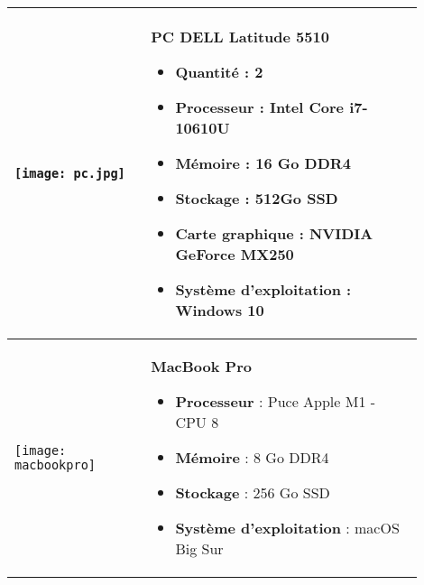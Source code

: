 \begin{longtable}{|p{0.3\linewidth}|p{0.6\linewidth}|}
      \begin{minipage}{\linewidth}
       \texttt{[image: pc.jpg]}
      \end{minipage} &
      \begin{minipage}{\linewidth}
        \vspace{0.2cm}
        \textbf{PC DELL Latitude 5510}
        \begin{itemize}
          \item \textbf{Quantité} : 2
          \item \textbf{Processeur} : Intel Core i7-10610U 
          \item \textbf{Mémoire} : 16 Go DDR4 
          \item \textbf{Stockage} : 512Go SSD 
          \item \textbf{Carte graphique} : NVIDIA GeForce MX250 
          \item \textbf{Système d'exploitation} : Windows 10 
        \end{itemize}
        \vspace{0.2cm}
      \end{minipage} \\
      \hline
      \begin{minipage}{\linewidth}
       \texttt{[image: macbookpro]}
      \end{minipage} &
      \begin{minipage}{\linewidth}
        \vspace{0.2cm}
        \textbf{MacBook Pro}
        \begin{itemize}
          \item \textbf{Processeur} : Puce Apple M1 - CPU 8 
          \item \textbf{Mémoire} : 8 Go DDR4
          \item \textbf{Stockage} : 256 Go SSD
          \item \textbf{Système d'exploitation} : macOS Big Sur 
        \end{itemize}
        \vspace{0.2cm}
      \end{minipage} \\



\end{longtable}
